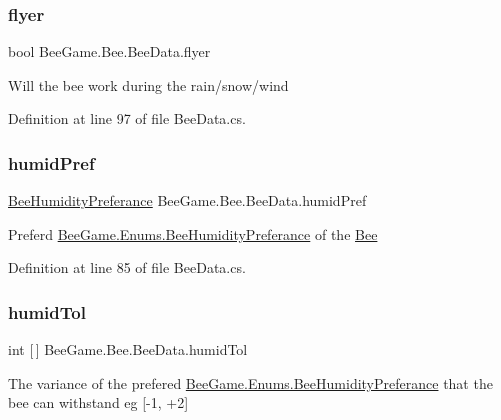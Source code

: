 \subsubsection{\texorpdfstring{flyer}{flyer}}
{\footnotesize\ttfamily bool Bee\+Game.\+Bee.\+Bee\+Data.\+flyer}



Will the bee work during the rain/snow/wind 



Definition at line 97 of file Bee\+Data.\+cs.

\mbox{\label{struct_bee_game_1_1_bee_1_1_bee_data_a6b786e9cb8f5bbf7b6d1a16d7c7eb37e}} 
\subsubsection{\texorpdfstring{humid\+Pref}{humidPref}}
{\footnotesize\ttfamily \hyperlink{namespace_bee_game_1_1_enums_a66566cbc9da8d1d1e402156b4bd3bf9d}{Bee\+Humidity\+Preferance} Bee\+Game.\+Bee.\+Bee\+Data.\+humid\+Pref}



Preferd \hyperlink{namespace_bee_game_1_1_enums_a66566cbc9da8d1d1e402156b4bd3bf9d}{Bee\+Game.\+Enums.\+Bee\+Humidity\+Preferance} of the \hyperlink{namespace_bee_game_1_1_bee}{Bee} 



Definition at line 85 of file Bee\+Data.\+cs.

\mbox{\label{struct_bee_game_1_1_bee_1_1_bee_data_a7d9953fe200dd4eb57a86db5fd7062e3}} 
\subsubsection{\texorpdfstring{humid\+Tol}{humidTol}}
{\footnotesize\ttfamily int \mbox{[}$\,$\mbox{]} Bee\+Game.\+Bee.\+Bee\+Data.\+humid\+Tol}



The variance of the prefered \hyperlink{namespace_bee_game_1_1_enums_a66566cbc9da8d1d1e402156b4bd3bf9d}{Bee\+Game.\+Enums.\+Bee\+Humidity\+Preferance} that the bee can withstand eg \mbox{[}-\/1, +2\mbox{]} 



